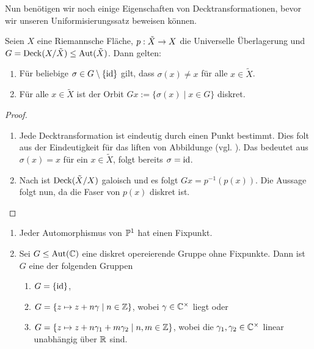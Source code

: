 Nun benötigen wir noch einige Eigenschaften von Decktransformationen,
bevor wir unseren Uniformisierungssatz beweisen können.

\begin{lemma}
  \label{lemma:decktrafo-diskret}
  Seien $X$ eine Riemannsche Fläche, $p: \tilde X \ra X$ die
  Universelle Überlagerung und $G = \Deck(X /\tilde X) \leq
  \Aut(\tilde X)$. Dann gelten:
  \begin{enumerate}
  \item Für beliebige $\sigma \in G \setminus \{\id\}$ gilt, dass $\sigma
    (x) \neq x $ für alle $x \in \tilde X$.
  \item Für alle $x \in \tilde X$ ist der Orbit $Gx := \{ \sigma(x)
    \mid x \in G\}$ diskret.
  \end{enumerate}
\end{lemma}

\begin{proof}
  \begin{enumerate}
  \item Jede Decktransformation ist eindeutig durch einen Punkt
    bestimmt. Dies folt aus der Eindeutigkeit für das liften von
    Abbildunge (vgl. \cite[Satz 4.8]{For}). Das bedeutet aus
    $\sigma(x) = x$ für ein $x \in \tilde X$, folgt
    bereits $\sigma = \id$.
  \item Nach \cite[Satz 5.6]{For} ist $\Deck(\tilde X/X)$ galoisch und
    es folgt $Gx = p^{-1}(p(x))$. Die Aussage folgt nun, da die Faser
    von $p(x)$ diskret ist.
  \end{enumerate}
\end{proof}

\begin{lemma}
  \label{lemma:deck-pc}
  \begin{enumerate}
  \item Jeder Automorphismus von $\P^1$ hat einen Fixpunkt.
  \item Sei $G \leq \Aut(\C)$ eine diskret opereierende Gruppe ohne
    Fixpunkte. Dann ist $G$ eine der folgenden Gruppen
    \begin{enumerate}
    \item $G = \{\id\}$,
    \item $G = \{ z \mapsto z + n \gamma \mid n \in \Z\}$, wobei $\gamma
      \in \C^\times$ liegt oder
    \item $G = \{z \mapsto z + n \gamma_1 + m \gamma_2 \mid n,m \in
      \Z\}$, wobei die $\gamma_1, \gamma_2 \in \C^\times$ linear
      unabhängig über $\R$ sind.
    \end{enumerate}
  \end{enumerate}
\end{lemma}

